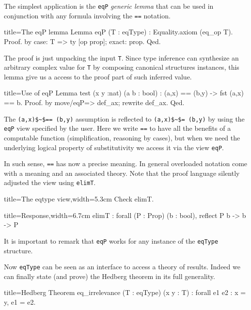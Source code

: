 The simplest application is the \lstinline/eqP/ \emph{generic lemma}
that can be used in conjunction with any formula involving the
\lstinline/==/ notation.

\begin{coq}{title=The eqP lemma}
Lemma eqP (T : eqType) : Equality.axiom (eq_op T).
Proof. by case: T => ty [op prop]; exact: prop. Qed.
\end{coq}

The proof is just unpacking the input \lstinline/T/.
Since type inference can synthesize
an arbitrary complex value for \lstinline/T/ by composing
canonical structures instances, this lemma give us a
access to the proof part of such inferred value.

\begin{coq}{title=Use of eqP}
Lemma test (x y :nat) (a b : bool) : (a,x) == (b,y) -> fst (a,x) == b.
Proof. by move/eqP=> def_ax; rewrite def_ax. Qed.
\end{coq}

The \lstinline/(a,x)$~$== (b,y)/ assumption is reflected to
\lstinline/(a,x)$~$= (b,y)/ by using the \lstinline/eqP/ view
specified by the user.  Here we write \lstinline/==/ to have
all the benefits of a computable function (simplification, reasoning
by cases), but when we need the underlying logical property of
substitutivity we access it via the view \lstinline/eqP/.

In such sense,
\lstinline/==/ has now a precise meaning.  In general overloaded
notation come with a meaning and an associated theory.
Note that the proof language silently adjusted the view
using \lstinline/elimT/.

\begin{coq}{title=The eqtype view,width=5.3cm}
Check elimT.
$~$
\end{coq}
\begin{coqout}{title=Response,width=6.7cm}
elimT : forall (P : Prop) (b : bool),
          reflect P b -> b -> P
\end{coqout}

It is important to remark that \lstinline/eqP/ works for any
instance of the \lstinline/eqType/ structure.

Now \lstinline/eqType/ can be seen as an interface to access a
theory of results.  Indeed we can finally state (and prove) the
Hedberg theorem in its full generality.

\begin{coq}{title=Hedberg}
Theorem eq_irrelevance (T : eqType) (x y : T) : forall e1 e2 : x = y, e1 = e2.
\end{coq}

